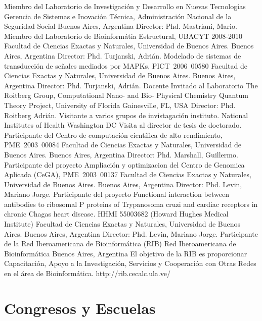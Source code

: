 	{Miembro del Laboratorio de Investigación y Desarrollo en Nuevas Tecnologías}
	{Gerencia de Sistemas e Inovación Técnica, Administración Nacional de la Seguridad Social}
	{Buenos Aires, Argentina}
	{}
	{Director: Phd. Mastriani, Mario.}
	{Miembro del Laboratorio de Bioinformátia Estructural, UBACYT 2008-2010}
	{Facultad de Ciencias Exactas y Naturales, Universidad de Buenos Aires.}
	{Buenos Aires, Argentina}
	{}
	{Director: Phd. Turjanski, Adrián.}
	{Modelado de sistemas de transducción de señales mediados por MAPKs, PICT~2006~00580}
	{Facultad de Ciencias Exactas y Naturales, Universidad de Buenos Aires.}
	{Buenos Aires, Argentina}
	{}
	{Director: Phd. Turjanski, Adrián.}
        {Docente Invitado al Laboratorio The Roitberg Group, Computational Nano- and Bio- Physical Chemistry}
	{Quantum Theory Project, University of Florida}
	{Gainesville, FL, USA}
	{}
	{Director: Phd. Roitberg Adrián.}
	{Visitante a varios grupos de invistagación instituto.}
	{National Institutes of Health}
	{Washington DC}
	{}
	{Visita al director de tesis de doctorado.}
	{Participante del Centro de computación científica de alto rendimiento, PME~2003~00084}
	{Facultad de Ciencias Exactas y Naturales, Universidad de Buenos Aires.}
	{Buenos Aires, Argentina}
	{}
	{Director: Phd. Marshall, Guillermo.}
        {Participante del proyecto Ampliación y optimizacion del Centro de Genomica Aplicada (CeGA), PME~2003~00137}
	{Facultad de Ciencias Exactas y Naturales, Universidad de Buenos Aires.}
	{Buenos Aires, Argentina}
	{}
	{Director: Phd. Levin, Mariano Jorge.}
	{Participante del proyecto Functional interaction between antibodies to ribosomal P proteins of Trypanosoma cruzi and cardiac receptors in chronic Chagas heart disease. HHMI 55003682 (Howard Hughes Medical Institute)}
	{Facultad de Ciencias Exactas y Naturales, Universidad de Buenos Aires.}
	{Buenos Aires, Argentina}
	{}
	{Director: Phd. Levin, Mariano Jorge.}
	{Participante de la Red Iberoamericana de Bioinformática (RIB)}
	{Red Iberoamericana de Bioinformática}
	{Buenos Aires, Argentina}
	{}
	{El objetivo de la RIB es proporcionar Capacitación, Apoyo a la Investigación, Servicios y Cooperación con Otras Redes en el área de Bioinformática. http://rib.cecalc.ula.ve/}

\section{Congresos y Escuelas}

